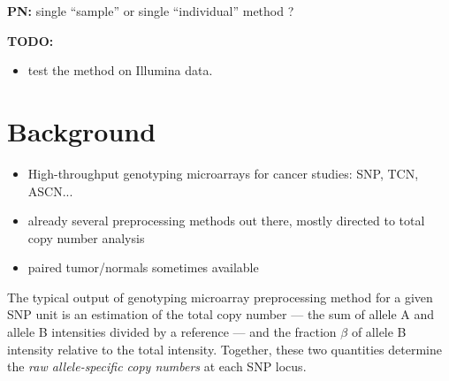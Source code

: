 \documentclass[10pt]{bmc_article}
\newenvironment{bmcformat}{\fussy\setboolean{publ}{true}}{\fussy}
\newenvironment{TODO}{\color{red}\textbf{TODO:}}{}
\newenvironment{PN}{\color{blue}\textbf{PN:}}{}
\begin{document}
\begin{bmcformat}

  \begin{PN}
    single ``sample'' or single ``individual'' method ?
  \end{PN}

  \begin{TODO}
    \begin{itemize}
    \item test the method on Illumina data.
    \end{itemize}
  \end{TODO}


\section*{Background}
\label{secBackground}

\begin{itemize}
\item High-throughput genotyping microarrays for cancer studies: SNP, TCN, ASCN...
\item already several preprocessing methods out there, mostly directed to total copy number analysis
\item paired tumor/normals sometimes available
\end{itemize}

The typical output of genotyping microarray preprocessing method for a given SNP unit is an estimation of the total copy number --- the sum of allele A and allele B intensities divided by a reference --- and the fraction $\beta$ of allele B intensity relative to the total intensity. Together, these two quantities determine the \emph{raw allele-specific copy numbers} at each SNP locus.


\end{bmcformat}
\end{document}
